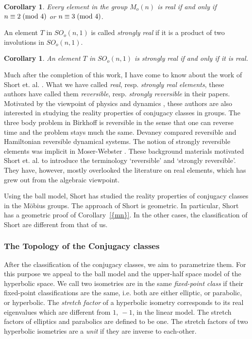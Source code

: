 \documentclass[11pt]{amsart}
\theoremstyle{definition}
\theoremstyle{remark}
\numberwithin{equation}{section}
\theoremstyle{plain}
\newtheorem{corollary}[theorem]{Corollary}
\begin{document}
\begin{corollary}\label{mn}
Every element in the group $M_o(n)$ is real if and only if  
$n \equiv 2\;(\hbox{mod }4)$ or $n \equiv 3 \;(\hbox{mod }4)$. 
\end{corollary}
An element $T$ in $SO_o(n,1)$ is called \emph{strongly real} if it is a product of two involutions in $SO_o(n,1)$.  
\begin{corollary}\label{1}
An element $T$ in $SO_o(n,1)$ is strongly real if and only if it is real. 
\end{corollary}
Much after the completion of this work,  I have come to know about the work of Short et. al. \cite{sh1, sh2}. What we have called \emph{real}, resp. \emph{strongly real elements}, these authors have called them \emph{reversible}, resp. \emph{strongly reversible} in their papers. Motivated by the viewpoint of physics and dynamics \cite{bir, d, mw}, these authors are also interested in  studying the reality properties of conjugacy classes in groups. The three body problem in Birkhoff \cite{bir} is reversible in the sense that one can reverse time and the problem stays much the same. Devaney \cite{d} compared reversible and Hamiltonian reversible dynamical systems. The notion of strongly reversible elements was implicit in Moser-Webster \cite{mw}. These background materials motivated  Short et. al. to introduce the terminology `reversible' and  `strongly reversible'.  They have, however,  mostly overlooked the literature on real elements, which has grew out from the algebraic viewpoint.  

Using the ball model, Short \cite{sh1} has  studied the reality properties of conjugacy classes in the M\"obius groups.  The  approach of Short is geometric.  In particular, Short has a geometric proof of {Corollary~\ref{{mn}}}. In the other cases, the classification of Short are different from that of us. 

\subsubsection*{The Topology of the Conjugacy classes} After the classification of the conjugacy classes, we aim to parametrize them. For this purpose we appeal to the ball model and the upper-half space model of the hyperbolic space.  We call two isometries are in the same \emph{fixed-point class} if their fixed-point classifications are the same, i.e. both are either elliptic, or  parabolic,  or hyperbolic. 
The \emph{stretch factor} of a hyperbolic isometry corresponds to its real eigenvalues which are different from $1, \  -1$,  in the linear model. The stretch factors of elliptics and parabolics are defined to be one. The stretch factors of two hyperbolic isometries are a \emph{unit} if they are inverse to each-other. 
\end{document}
